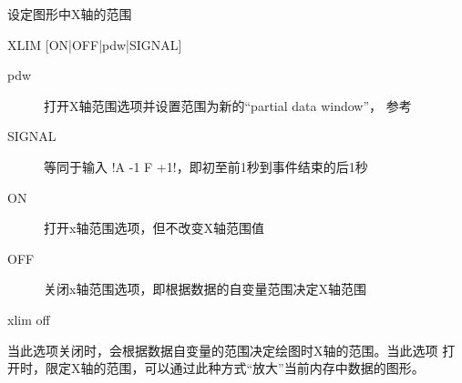 \label{cmd:xlim}

设定图形中X轴的范围

\begin{SACSTX}
XLIM [ON|OFF|pdw|SIGNAL]
\end{SACSTX}

\begin{description}
\item [pdw] 打开X轴范围选项并设置范围为新的``partial data window''，
    参考 
\item [SIGNAL] 等同于输入 !A -1 F +1!，即初至前1秒到事件结束的后1秒
\item [ON] 打开x轴范围选项，但不改变X轴范围值
\item [OFF] 关闭x轴范围选项，即根据数据的自变量范围决定X轴范围
\end{description}

\begin{SACDFT}
xlim off
\end{SACDFT}

当此选项关闭时，会根据数据自变量的范围决定绘图时X轴的范围。当此选项
打开时，限定X轴的范围，可以通过此种方式``放大''当前内存中数据的图形。
